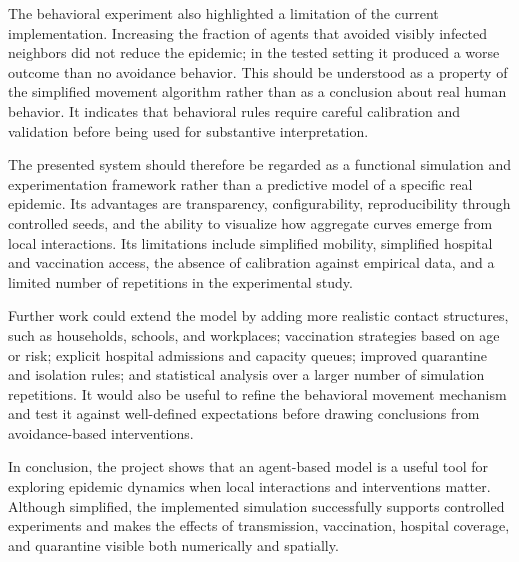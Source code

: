 \documentclass[english]{projectreport}
\begin{document}
The behavioral experiment also highlighted a limitation of the current
implementation. Increasing the fraction of agents that avoided visibly
infected neighbors did not reduce the epidemic; in the tested setting it
produced a worse outcome than no avoidance behavior. This should be
understood as a property of the simplified movement algorithm rather than
as a conclusion about real human behavior. It indicates that behavioral
rules require careful calibration and validation before being used for
substantive interpretation.

The presented system should therefore be regarded as a functional
simulation and experimentation framework rather than a predictive model
of a specific real epidemic. Its advantages are transparency,
configurability, reproducibility through controlled seeds, and the
ability to visualize how aggregate curves emerge from local interactions.
Its limitations include simplified mobility, simplified hospital and
vaccination access, the absence of calibration against empirical data,
and a limited number of repetitions in the experimental study.

Further work could extend the model by adding more realistic contact
structures, such as households, schools, and workplaces; vaccination
strategies based on age or risk; explicit hospital admissions and
capacity queues; improved quarantine and isolation rules; and statistical
analysis over a larger number of simulation repetitions. It would also
be useful to refine the behavioral movement mechanism and test it against
well-defined expectations before drawing conclusions from avoidance-based
interventions.

In conclusion, the project shows that an agent-based model is a useful
tool for exploring epidemic dynamics when local interactions and
interventions matter. Although simplified, the implemented simulation
successfully supports controlled experiments and makes the effects of
transmission, vaccination, hospital coverage, and quarantine visible both
numerically and spatially.

\printbibliography

\end{document}
